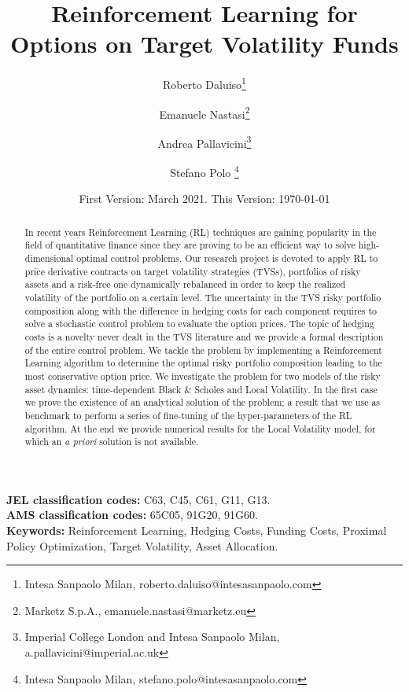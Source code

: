 \documentclass[11pt]{article}
\title{Reinforcement Learning for Options on Target Volatility Funds}
\author{
	Roberto Daluiso\thanks{Intesa Sanpaolo Milan, roberto.daluiso@intesasanpaolo.com}
	\and 
	Emanuele Nastasi\thanks{Marketz S.p.A., emanuele.nastasi@marketz.eu}
	\and Andrea Pallavicini\thanks{Imperial College London and Intesa Sanpaolo Milan, a.pallavicini@imperial.ac.uk} 
	\and
	Stefano Polo \thanks{Intesa Sanpaolo Milan, stefano.polo@intesasanpaolo.com}%
}
\date{
	First Version: March 2021. This Version: \today
}
\begin{document}

\maketitle

\begin{abstract}
\noindent In recent years Reinforcement Learning (RL) techniques are gaining popularity in the field of quantitative finance since they are proving to be an efficient way to solve  high-dimensional optimal control problems. 
Our research project is devoted to apply RL to price derivative contracts on target volatility strategies (TVSs), portfolios of risky assets and a risk-free one dynamically rebalanced in order to keep the realized volatility of the portfolio on a certain level. The uncertainty in the TVS risky portfolio composition along with the difference in hedging costs for each component requires to solve a stochastic control problem to evaluate the option prices. The topic of hedging costs is a novelty never dealt in the TVS literature and we provide a formal description of the entire control problem. We tackle the problem by implementing a Reinforcement Learning algorithm to determine the optimal risky portfolio composition leading to the most conservative option price.  We investigate the problem for two models of the risky asset dynamics: time-dependent Black \& Scholes and Local Volatility. In the first case we prove the existence of an analytical solution of the problem; a result that we use as benchmark to perform a series of fine-tuning of the hyper-parameters of the RL algorithm. At the end we provide numerical results for the Local Volatility model, for which an \textit{a priori} solution is not available.
\end{abstract}

\smallskip
\noindent
\textbf{JEL classification codes:} C63, C45, C61, G11, G13.\\
\textbf{AMS classification codes:} 65C05, 91G20, 91G60.\\
\textbf{Keywords:} Reinforcement Learning, Hedging Costs, Funding Costs, Proximal Policy Optimization, Target Volatility, Asset Allocation. 
\newpage
\tableofcontents
\newpage
\pagestyle{myheadings} 
\end{document}
